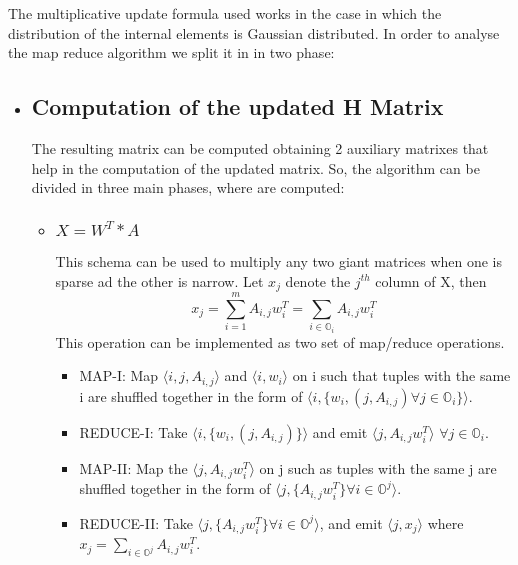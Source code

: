 \documentclass[a4paper,12pt]{article}
\begin{document}
The multiplicative update formula used works in the case
in which the distribution of the internal elements is Gaussian
distributed. 
In order to analyse the map reduce algorithm we split it in in two
phase:
\begin{itemize}
  \item \subsection{Computation of the updated H Matrix}
    The resulting matrix can be computed obtaining 2 auxiliary
    matrixes that help in the computation of the updated matrix. So,
    the algorithm can be divided in three main phases, where are
    computed:
    \begin{itemize}
      \item \subsubsection{$ X = W^T * A $}
        This schema can be used to multiply any two giant matrices when one
        is sparse ad the other is narrow. Let $x_j$ denote the $j^{th}$ column of X, then 
        $$ x_j = \sum_{i=1}^{m} A_{i,j} w_{i}^{T} = \sum_{i \in \mathbb{O}_i} A_{i,j} w_{i}^{T} $$ 
        This operation can be implemented as two set of map/reduce
        operations.
        \begin{itemize}
          \item MAP-I: Map $ \langle i, j, A_{i,j} \rangle $ and $\langle i, w_i \rangle$ on i
            such that tuples with the same i are shuffled together in
            the form of  $ \langle i, \{w_{i}, (j, A_{i,j}) \forall j
            \in \mathbb{O}_i \} \rangle$.

         \item REDUCE-I: Take  $ \langle i, \{w_{i}, (j, A_{i,j}) \}
           \rangle$ and emit  $ \langle j, A_{i,j}  w_{i}^{T}
           \rangle$ $\forall j \in \mathbb{O}_i $.

          \item MAP-II: Map the $ \langle j, A_{i,j}  w_{i}^{T}
           \rangle$ on j such as tuples with the same j are shuffled
           together in the form of $ \langle j, \{A_{i,j}  w_{i}^{T} \}
           \forall i \in \mathbb{O}^j \rangle$.

          \item REDUCE-II: Take $ \langle j, \{A_{i,j}  w_{i}^{T} \}
           \forall i \in \mathbb{O}^j \rangle$, and emit $\langle j,
           x_j \rangle$ where $ x_j = \sum_{i \in \mathbb{O}^j} A_{i,j}  w_{i}^{T} $.


\end{itemize}
\end{itemize}
\end{itemize}
\end{document}
